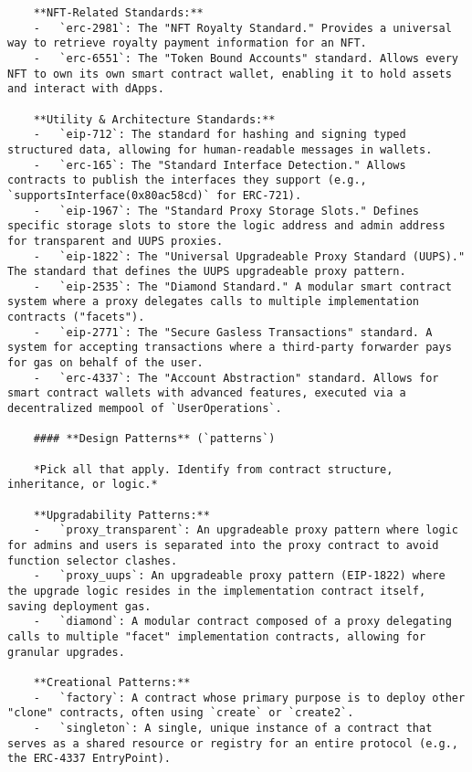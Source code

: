 \begin{lstlisting}
    **NFT-Related Standards:**
    -   `erc-2981`: The "NFT Royalty Standard." Provides a universal way to retrieve royalty payment information for an NFT.
    -   `erc-6551`: The "Token Bound Accounts" standard. Allows every NFT to own its own smart contract wallet, enabling it to hold assets and interact with dApps.

    **Utility & Architecture Standards:**
    -   `eip-712`: The standard for hashing and signing typed structured data, allowing for human-readable messages in wallets.
    -   `erc-165`: The "Standard Interface Detection." Allows contracts to publish the interfaces they support (e.g., `supportsInterface(0x80ac58cd)` for ERC-721).
    -   `eip-1967`: The "Standard Proxy Storage Slots." Defines specific storage slots to store the logic address and admin address for transparent and UUPS proxies.
    -   `eip-1822`: The "Universal Upgradeable Proxy Standard (UUPS)." The standard that defines the UUPS upgradeable proxy pattern.
    -   `eip-2535`: The "Diamond Standard." A modular smart contract system where a proxy delegates calls to multiple implementation contracts ("facets").
    -   `eip-2771`: The "Secure Gasless Transactions" standard. A system for accepting transactions where a third-party forwarder pays for gas on behalf of the user.
    -   `erc-4337`: The "Account Abstraction" standard. Allows for smart contract wallets with advanced features, executed via a decentralized mempool of `UserOperations`.

    #### **Design Patterns** (`patterns`)

    *Pick all that apply. Identify from contract structure, inheritance, or logic.*

    **Upgradability Patterns:**
    -   `proxy_transparent`: An upgradeable proxy pattern where logic for admins and users is separated into the proxy contract to avoid function selector clashes.
    -   `proxy_uups`: An upgradeable proxy pattern (EIP-1822) where the upgrade logic resides in the implementation contract itself, saving deployment gas.
    -   `diamond`: A modular contract composed of a proxy delegating calls to multiple "facet" implementation contracts, allowing for granular upgrades.

    **Creational Patterns:**
    -   `factory`: A contract whose primary purpose is to deploy other "clone" contracts, often using `create` or `create2`.
    -   `singleton`: A single, unique instance of a contract that serves as a shared resource or registry for an entire protocol (e.g., the ERC-4337 EntryPoint).


\end{lstlisting}
